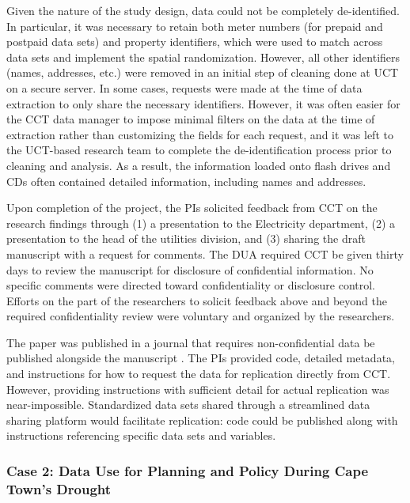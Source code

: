 \documentclass[
]{book}
\begin{document}
Given the nature of the study design, data could not be completely de-identified. In particular, it was necessary to retain both meter numbers (for prepaid and postpaid data sets) and property identifiers, which were used to match across data sets and implement the spatial randomization. However, all other identifiers (names, addresses, etc.) were removed in an initial step of cleaning done at UCT on a secure server. In some cases, requests were made at the time of data extraction to only share the necessary identifiers. However, it was often easier for the CCT data manager to impose minimal filters on the data at the time of extraction rather than customizing the fields for each request, and it was left to the UCT-based research team to complete the de-identification process prior to cleaning and analysis. As a result, the information loaded onto flash drives and CDs often contained detailed information, including names and addresses.

Upon completion of the project, the PIs solicited feedback from CCT on the research findings through (1) a presentation to the Electricity department, (2) a presentation to the head of the utilities division, and (3) sharing the draft manuscript with a request for comments. The DUA required CCT be given thirty days to review the manuscript for disclosure of confidential information. No specific comments were directed toward confidentiality or disclosure control. Efforts on the part of the researchers to solicit feedback above and beyond the required confidentiality review were voluntary and organized by the researchers.

The paper was published in a journal that requires non-confidential data be published alongside the manuscript \citep{jack2020}. The PIs provided code, detailed metadata, and instructions for how to request the data for replication directly from CCT. However, providing instructions with sufficient detail for actual replication was near-impossible. Standardized data sets shared through a streamlined data sharing platform would facilitate replication: code could be published along with instructions referencing specific data sets and variables.

\hypertarget{case-2-data-use-for-planning-and-policy-during-cape-towns-drought}{%
\subsubsection*{Case 2: Data Use for Planning and Policy During Cape Town's Drought}\label{case-2-data-use-for-planning-and-policy-during-cape-towns-drought}}
\end{document}
